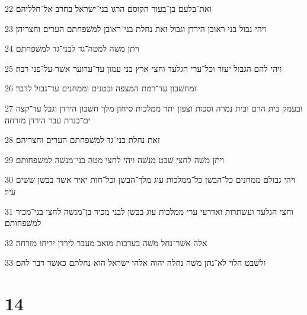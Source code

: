 \par 22 ואת־בלעם בן־בעור הקוסם הרגו בני־ישׂראל בחרב אל־חלליהם׃
\par 23 ויהי גבול בני ראובן הירדן וגבול זאת נחלת בני־ראובן למשׁפחתם הערים וחצריהן׃
\par 24 ויתן משׁה למטה־גד לבני־גד למשׁפחתם׃
\par 25 ויהי להם הגבול יעזר וכל־ערי הגלעד וחצי ארץ בני עמון עד־ערוער אשׁר על־פני רבה׃
\par 26 ומחשׁבון עד־רמת המצפה ובטנים וממחנים עד־גבול לדבר׃
\par 27 ובעמק בית הרם ובית נמרה וסכות וצפון יתר ממלכות סיחון מלך חשׁבון הירדן וגבל עד־קצה ים־כנרת עבר הירדן מזרחה׃
\par 28 זאת נחלת בני־גד למשׁפחתם הערים וחצריהם׃
\par 29 ויתן משׁה לחצי שׁבט מנשׁה ויהי לחצי מטה בני־מנשׁה למשׁפחותם׃
\par 30 ויהי גבולם ממחנים כל־הבשׁן כל־ממלכות עוג מלך־הבשׁן וכל־חות יאיר אשׁר בבשׁן שׁשׁים עיר׃
\par 31 וחצי הגלעד ועשׁתרות ואדרעי ערי ממלכות עוג בבשׁן לבני מכיר בן־מנשׁה לחצי בני־מכיר למשׁפחותם׃
\par 32 אלה אשׁר־נחל משׁה בערבות מואב מעבר לירדן יריחו מזרחה׃
\par 33 ולשׁבט הלוי לא־נתן משׁה נחלה יהוה אלהי ישׂראל הוא נחלתם כאשׁר דבר להם׃

\chapter{14}

